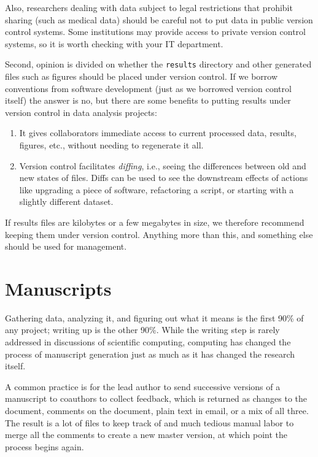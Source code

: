 \documentclass[10pt]{article}
\begin{document}
Also, researchers dealing with data subject to legal restrictions that
prohibit sharing (such as medical data) should be careful not to put
data in public version control systems. Some institutions may provide
access to private version control systems, so it is worth checking with
your IT department.

Second, opinion is divided on whether the \texttt{results} directory and
other generated files such as figures should be placed under version
control. If we borrow conventions from software development (just as we
borrowed version control itself) the answer is no, but there are some
benefits to putting results under version control in data analysis
projects:

\begin{enumerate}
\item
  It gives collaborators immediate access to current processed data,
  results, figures, etc., without needing to regenerate it all.
\item
  Version control facilitates \emph{diffing}, i.e., seeing the
  differences between old and new states of files. Diffs can be used to
  see the downstream effects of actions like upgrading a piece of
  software, refactoring a script, or starting with a slightly different
  dataset.
\end{enumerate}

If results files are kilobytes or a few megabytes in size, we therefore
recommend keeping them under version control. Anything more than this,
and something else should be used for management.

\section{Manuscripts}\label{manuscripts}

Gathering data, analyzing it, and figuring out what it means is the
first 90\% of any project; writing up is the other 90\%. While the
writing step is rarely addressed in discussions of scientific computing,
computing has changed the process of manuscript generation just as much
as it has changed the research itself.

A common practice is for the lead author to send successive versions of
a manuscript to coauthors to collect feedback, which is returned as
changes to the document, comments on the document, plain text in email,
or a mix of all three. The result is a lot of files to keep track of and
much tedious manual labor to merge all the comments to create a new
master version, at which point the process begins again.
\end{document}
